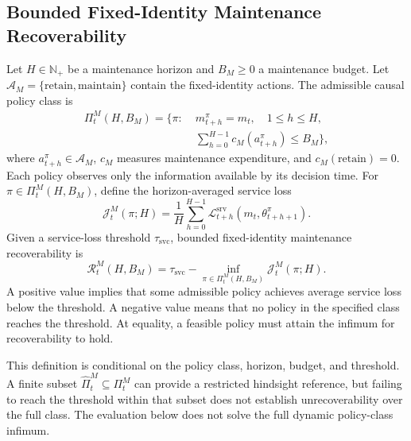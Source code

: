 \documentclass[journal]{IEEEtran}
\begin{document}
\subsection{Bounded Fixed-Identity Maintenance Recoverability}
Let $H\in\mathbb N_{+}$ be a maintenance horizon and $B_M\geq0$ a
maintenance budget. Let $\mathcal A_M=\{\mathrm{retain},\mathrm{maintain}\}$
contain the fixed-identity actions. The admissible causal policy class is
\begin{equation}
\begin{aligned}
\Pi_t^M(H,B_M)=\bigl\{\pi:\;&
 m_{t+h}^{\pi}=m_t,\quad 1\le h\le H,\\
&\sum_{h=0}^{H-1}c_M(a_{t+h}^{\pi})\le B_M
\bigr\},
\end{aligned}
\end{equation}
where $a_{t+h}^{\pi}\in\mathcal A_M$, $c_M$ measures maintenance
expenditure, and $c_M(\mathrm{retain})=0$.
Each policy observes only the information available by its decision
time. For $\pi\in\Pi_t^M(H,B_M)$, define the horizon-averaged
service loss
\begin{equation}
\mathcal J_t^M(\pi;H)=\frac1H\sum_{h=0}^{H-1}
\mathcal L_{t+h}^{\mathrm{srv}}
(m_t,\theta_{t+h+1}^{\pi}).
\end{equation}
Given a service-loss threshold $\tau_{\mathrm{svc}}$, bounded
fixed-identity maintenance recoverability is
\begin{equation}
\mathcal R_t^M(H,B_M)=\tau_{\mathrm{svc}}-
\inf_{\pi\in\Pi_t^M(H,B_M)}\mathcal J_t^M(\pi;H).
\end{equation}
A positive value implies that some admissible policy achieves
average service loss below the threshold. A negative value means
that no policy in the specified class reaches the threshold.
At equality, a feasible policy must attain the infimum for
recoverability to hold.

This definition is conditional on the policy class, horizon,
budget, and threshold. A finite subset
$\widehat\Pi_t^M\subseteq\Pi_t^M$ can provide a restricted
hindsight reference, but failing to reach the threshold within
that subset does not establish unrecoverability over the full
class. The evaluation below does not solve the full dynamic
policy-class infimum.
\end{document}
